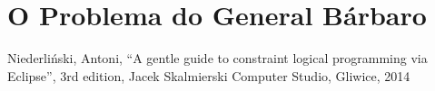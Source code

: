 
%


%

\section{O Problema do General Bárbaro}






  \begin{thebibliography}{2}

    Niederliński, Antoni,
    ``A gentle guide to constraint logical programming via Eclipse'',
    3rd edition, Jacek Skalmierski Computer Studio, Gliwice, 2014



  \end{thebibliography}

%
